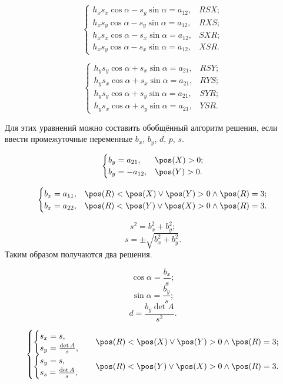 $$\begin{cases}
	h_x s_x\cos\alpha - s_y\sin\alpha = a_{12}, & RSX;\\
	h_x s_y\cos\alpha - s_y\sin\alpha = a_{12}, & RXS;\\
	h_x s_x\cos\alpha - s_x\sin\alpha = a_{12}, & SXR;\\
	h_x s_y\cos\alpha - s_x\sin\alpha = a_{12}, & XSR.
\end{cases}$$

$$\begin{cases}
	h_y s_y\cos\alpha + s_x\sin\alpha = a_{21}, & RSY;\\
	h_y s_x\cos\alpha + s_x\sin\alpha = a_{21}, & RYS;\\
	h_y s_y\cos\alpha + s_y\sin\alpha = a_{21}, & SYR;\\
	h_y s_x\cos\alpha + s_y\sin\alpha = a_{21}, & YSR.
\end{cases}$$

Для этих уравнений можно составить обобщённый алгоритм решения, если ввести промежуточные переменные
$b_x$, $b_y$, $d$, $p$, $s$.

$$\begin{cases}
	b_y = a_{21}, & \pos(X)>0;\\
	b_y = -a_{12}, & \pos(Y)>0.\\
\end{cases}$$

$$\begin{cases}
	b_x = a_{11}, & \pos(R) < \pos(X) \vee \pos(Y) > 0 \wedge \pos(R) = 3;\\
	b_x = a_{22}, & \pos(R) < \pos(Y) \vee \pos(X) > 0 \wedge \pos(R) = 3.
\end{cases}$$

$$s^2 = b_x^2 + b_y^2;$$
$$s = \pm \sqrt{b_x^2 + b_y^2}.$$
Таким образом получаются два решения.

$$\cos\alpha = \frac{b_x}{s};$$
$$\sin\alpha = \frac{b_y}{s};$$
$$d = \frac{b_y \det A}{s^2}.$$

$$\begin{cases}
	\begin{cases}
		s_x = s,\\
		s_y = \frac{\det A}{s},
	\end{cases} & \pos(R) < \pos(X) \vee \pos(Y) > 0 \wedge \pos(R) = 3;\\
	\begin{cases}
		s_y = s,\\
		s_s = \frac{\det A}{s},
	\end{cases} & \pos(R) < \pos(Y) \vee \pos(X) > 0 \wedge \pos(R) = 3.
\end{cases}$$

